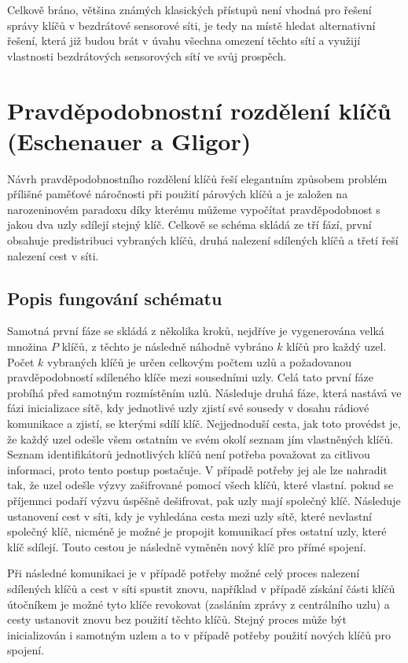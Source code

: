 \documentclass[11pt,final,twoside]{fithesis2}
\begin{document}
Celkově bráno, většina známých klasických přístupů není vhodná pro řešení správy klíčů v bezdrátové sensorové síti, je tedy na místě hledat alternativní řešení,
která již budou brát v úvahu všechna omezení těchto sítí a využijí vlastnosti bezdrátových sensorových sítí ve svůj prospěch.

\section{Pravděpodobnostní rozdělení klíčů (Eschenauer a Gligor)} \label{sec:Eschenauer}
Návrh pravděpodobnostního rozdělení klíčů \cite{Eschenauer2002} řeší elegantním způsobem problém přílišné paměťové náročnosti při použití párových klíčů a je 
založen na narozeninovém paradoxu díky kterému můžeme vypočítat pravděpodobnost s jakou dva uzly sdílejí stejný klíč. 
Celkově se schéma skládá ze tří fází, první obsahuje predistribuci vybraných klíčů, druhá nalezení sdílených klíčů a třetí řeší nalezení cest v síti.

\subsection{Popis fungování schématu}
Samotná první fáze se skládá z několika kroků, nejdříve je vygenerována velká množina $P$ klíčů, z těchto je následně náhodně vybráno $k$ klíčů pro každý
uzel. Počet $k$ vybraných klíčů je určen celkovým počtem uzlů a požadovanou pravděpodobností sdíleného klíče mezi sousedními uzly. Celá tato první fáze 
probíhá před samotným rozmístěním uzlů. Následuje druhá fáze, která nastává ve fázi inicializace sítě, kdy jednotlivé uzly zjistí své sousedy v dosahu 
rádiové komunikace a zjistí, se kterými sdílí klíč. Nejjednoduší cesta, jak toto provédst je, že každý uzel odešle všem ostatním ve svém okolí seznam jím 
vlastněných klíčů. Seznam identifikátorů jednotlivých klíčů není potřeba považovat za citlivou informaci, proto tento postup postačuje. V případě potřeby 
jej ale lze nahradit tak, že uzel odešle výzvy zašifrované pomocí všech klíčů, které vlastní. pokud se příjemnci podaří výzvu úspěšně dešifrovat, pak
uzly mají společný klíč. Následuje ustanovení cest v síti, kdy je vyhledána cesta mezi uzly sítě, které nevlastní společný klíč, nicméně je možné je propojit 
komunikací přes ostatní uzly, které klíč sdílejí. Touto cestou je následně vyměněn nový klíč pro přímé spojení. 

Při následné komunikaci je v případě potřeby možné celý proces nalezení sdílených klíčů a cest v síti spustit znovu, například v případě získání části klíčů útočníkem
je možné tyto klíče revokovat (zasláním zprávy z centrálního uzlu) a cesty ustanovit znovu bez použití těchto klíčů. Stejný proces může být inicializován i samotným uzlem
a to v případě potřeby použití nových klíčů pro spojení. 
\end{document}
